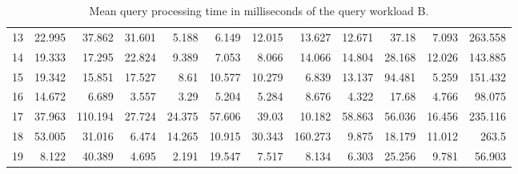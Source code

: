 \begin{table}[!th]
{\begin{tabular}{|c|r|r|r|r|r|r|r|r|r|r|r|}
			13 & 22.995 & 37.862  & 31.601 & 5.188  & 6.149  & 12.015 & 13.627  & 12.671 & 37.18   & 7.093   & 263.558 \\
			14 & 19.333 & 17.295  & 22.824 & 9.389  & 7.053  & 8.066  & 14.066  & 14.804 & 28.168  & 12.026  & 143.885 \\
			15 & 19.342 & 15.851  & 17.527 & 8.61   & 10.577 & 10.279 & 6.839   & 13.137 & 94.481  & 5.259   & 151.432 \\
			16 & 14.672 & 6.689   & 3.557  & 3.29   & 5.204  & 5.284  & 8.676   & 4.322  & 17.68   & 4.766   & 98.075  \\
			17 & 37.963 & 110.194 & 27.724 & 24.375 & 57.606 & 39.03  & 10.182  & 58.863 & 56.036  & 16.456  & 235.116 \\
			18 & 53.005 & 31.016  & 6.474  & 14.265 & 10.915 & 30.343 & 160.273 & 9.875  & 18.179  & 11.012  & 263.5   \\
			19 & 8.122  & 40.389  & 4.695  & 2.191  & 19.547 & 7.517  & 8.134   & 6.303  & 25.256  & 9.781   & 56.903  \\ \hline
		\end{tabular}%
	}
	\caption{Mean query processing time in milliseconds of the query workload B.}
	\label{tab:benchmark_B}
\end{table}


